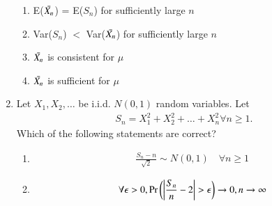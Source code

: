 \begin{enumerate}[label=\thesection.\arabic*.,ref=\thesection.\theenumi]
\begin{enumerate}
    \item E($\Bar{X_{n}}$) = E($S_{n}$) for sufficiently large $n$
    \label{conv/3/option 1}
    \item Var($S_{n}$) $<$ Var($\Bar{X_{n}}$) for sufficiently large $n$
    \label{conv/3/option 2}
    \item $\Bar{X_{n}}$ is consistent for $\mu$
    \label{conv/3/option 3}
    \item $\Bar{X_{n}}$ is sufficient for $\mu$
    \label{conv/3/option 4}
\end{enumerate}
%
\solution

%
% 


\item Let $X_1,X_2, \dots$ be i.i.d. $N(0,1)$ random variables. Let 
\begin{align}
S_{n}=X_{1}^2+X_{2}^2+\dots+X_{n}^2 \forall n \geq 1. 
\end{align}
Which of the following statements are correct?
%
\begin{enumerate}
\setlength\itemsep{1em}
\item 
\begin{align}
    \frac{S_{n}-n}{\sqrt{2}}\sim N(0,1) \quad  \forall n\geq 1
\end{align}
\item 
\begin{align}
    \forall \epsilon > 0,\Pr\left(\left\vert\frac{S_n}{n}-2\right\vert>\epsilon\right)\to 0, n \to \infty
\end{align}


\end{enumerate}
\end{enumerate}
